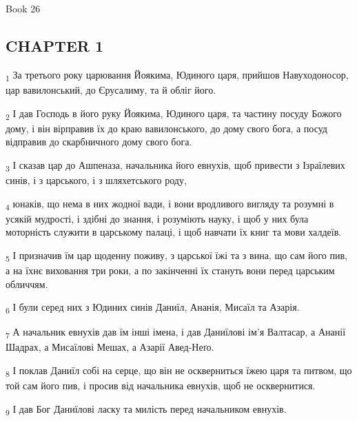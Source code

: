 Book 26
\subsection{CHAPTER 1}
\begin{tcolorbox}
\textsubscript{1} За третього року царювання Йоякима, Юдиного царя, прийшов Навуходоносор, цар вавилонський, до Єрусалиму, та й обліг його.
\end{tcolorbox}
\begin{tcolorbox}
\textsubscript{2} І дав Господь в його руку Йоякима, Юдиного царя, та частину посуду Божого дому, і він вірправив їх до краю вавилонського, до дому свого бога, а посуд відправив до скарбничного дому свого бога.
\end{tcolorbox}
\begin{tcolorbox}
\textsubscript{3} І сказав цар до Ашпеназа, начальника його евнухів, щоб привести з Ізраїлевих синів, і з царського, і з шляхетського роду,
\end{tcolorbox}
\begin{tcolorbox}
\textsubscript{4} юнаків, що нема в них жодної вади, і вони вродливого вигляду та розумні в усякій мудрості, і здібні до знання, і розуміють науку, і щоб у них була моторність служити в царському палаці, і щоб навчати їх книг та мови халдеїв.
\end{tcolorbox}
\begin{tcolorbox}
\textsubscript{5} І призначив їм цар щоденну поживу, з царської їжі та з вина, що сам його пив, а на їхнє виховання три роки, а по закінченні їх стануть вони перед царським обличчям.
\end{tcolorbox}
\begin{tcolorbox}
\textsubscript{6} І були серед них з Юдиних синів Даниїл, Ананія, Мисаїл та Азарія.
\end{tcolorbox}
\begin{tcolorbox}
\textsubscript{7} А начальник евнухів дав їм інші імена, і дав Даниїлові ім'я Валтасар, а Ананії Шадрах, а Мисаїлові Мешах, а Азарії Авед-Неґо.
\end{tcolorbox}
\begin{tcolorbox}
\textsubscript{8} І поклав Даниїл собі на серце, що він не оскверниться їжею царя та питвом, що той сам його пив, і просив від начальника евнухів, щоб не осквернитися.
\end{tcolorbox}
\begin{tcolorbox}
\textsubscript{9} І дав Бог Даниїлові ласку та милість перед начальником евнухів.
\end{tcolorbox}
